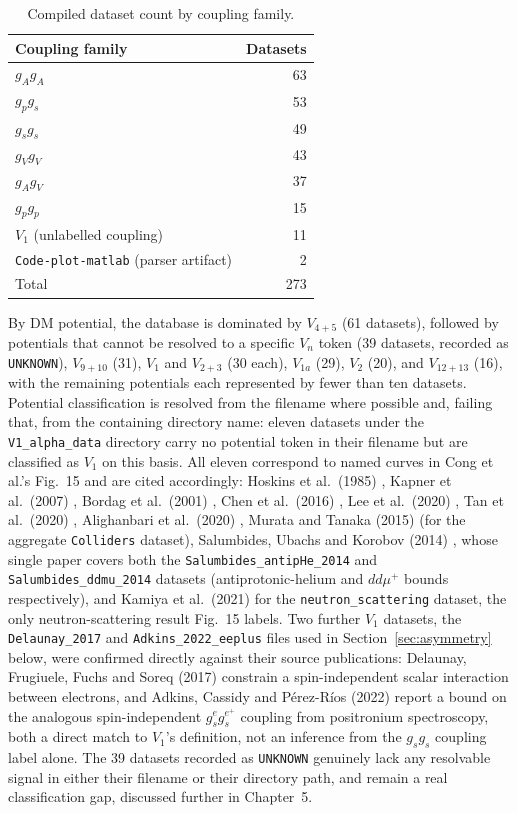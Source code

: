 \documentclass[main]{subfiles}
\begin{document}
\begin{table}[h]
\centering
\begin{tabular}{@{}lr@{}}
\toprule
Coupling family & Datasets \\
\midrule
$g_Ag_A$ & 63 \\
$g_pg_s$ & 53 \\
$g_sg_s$ & 49 \\
$g_Vg_V$ & 43 \\
$g_Ag_V$ & 37 \\
$g_pg_p$ & 15 \\
$V_1$ (unlabelled coupling) & 11 \\
\texttt{Code-plot-matlab} (parser artifact) & 2 \\
\midrule
Total & 273 \\
\bottomrule
\end{tabular}
\caption{Compiled dataset count by coupling family.}
\label{tab:coupling-breakdown}
\end{table}

By DM potential, the database is dominated by $V_{4+5}$ (61 datasets),
followed by potentials that cannot be resolved to a specific $V_n$ token
(39 datasets, recorded as \texttt{UNKNOWN}), $V_{9+10}$ (31), $V_1$ and
$V_{2+3}$ (30 each), $V_{1a}$ (29), $V_2$ (20), and $V_{12+13}$ (16), with
the remaining potentials each represented by fewer than ten datasets.
Potential classification is resolved from the filename where possible and,
failing that, from the containing directory name: eleven datasets under
the \texttt{V1\_alpha\_data} directory carry no potential token in their
filename but are classified as $V_1$ on this basis. All eleven
correspond to named curves in Cong et al.'s Fig.~15 and are cited
accordingly: Hoskins et al.\ (1985) \cite{Hoskins1985}, Kapner et al.\
(2007) \cite{Kapner2007}, Bordag et al.\ (2001) \cite{Bordag2001}, Chen et
al.\ (2016) \cite{Chen2016}, Lee et al.\ (2020) \cite{Lee2020}, Tan et
al.\ (2020) \cite{Tan2020}, Alighanbari et al.\ (2020)
\cite{Alighanbari2020}, Murata and Tanaka (2015) \cite{Murata2015} (for
the aggregate \texttt{Colliders} dataset), Salumbides, Ubachs and
Korobov (2014) \cite{Salumbides2014}, whose single paper covers both the
\texttt{Salumbides\_antipHe\_2014} and \texttt{Salumbides\_ddmu\_2014}
datasets (antiprotonic-helium and $dd\mu^+$ bounds respectively), and
Kamiya et al.\ (2021) \cite{Kamiya2021} for the \texttt{neutron\_scattering}
dataset, the only neutron-scattering result Fig.~15 labels. Two further
$V_1$ datasets, the
\texttt{Delaunay\_2017} and \texttt{Adkins\_2022\_eeplus} files used in
Section~\ref{sec:asymmetry} below, were confirmed directly against their
source publications: Delaunay, Frugiuele, Fuchs and Soreq (2017)
\cite{Delaunay2017} constrain a spin-independent scalar interaction
between electrons, and Adkins, Cassidy and P\'{e}rez-R\'{i}os (2022)
\cite{Adkins2022} report a bound on the analogous spin-independent
$g_s^eg_s^{e^+}$ coupling from positronium spectroscopy, both a direct
match to $V_1$'s definition, not an inference from the $g_sg_s$ coupling
label alone. The 39 datasets recorded as \texttt{UNKNOWN} genuinely lack
any resolvable signal in either their filename or their directory path,
and remain a real classification gap, discussed further in Chapter~5.
\end{document}
